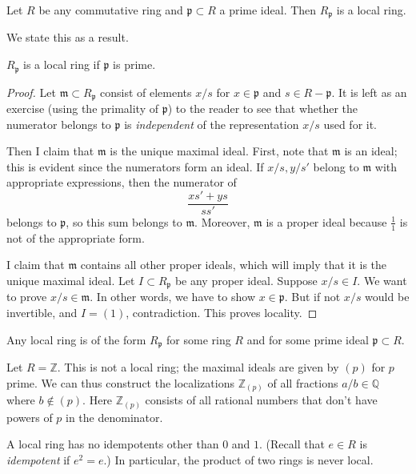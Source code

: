 \begin{example}
Let $R$ be any commutative ring and $\mathfrak{p}\subset R$ a prime ideal. Then
$R_{\mathfrak{p}}$ is a local ring.

We state this as a result.
\begin{proposition}
$R_{\mathfrak{p}}$ is a local ring if $\mathfrak{p}$ is prime.\end{proposition}
\begin{proof}
Let $\mathfrak{m} \subset R_{\mathfrak{p}}$ consist of elements $x/s$ for $x
\in \mathfrak{p}$ and $s \in R - \mathfrak{p}$. It is left as an exercise
(using the primality of $\mathfrak{p}$) to
the reader to see that whether the numerator belongs to $\mathfrak{p}$ is
\emph{independent} of the representation $x/s$ used for it.

Then I claim that $\mathfrak{m}$ is the
unique maximal ideal. First, note that $\mathfrak{m}$ is
an ideal; this is evident since the numerators form an ideal. If $x/s, y/s'$
belong to $\mathfrak{m}$ with appropriate expressions, then
the numerator of
\[ \frac{xs'+ys}{ss'}  \]
belongs to $\mathfrak{p}$, so this sum belongs to $\mathfrak{m}$.  Moreover,
$\mathfrak{m}$ is a proper ideal because $\frac{1}{1}$ is not of the
appropriate form.

I claim that $\mathfrak{m}$ contains all other proper ideals, which will imply
that it is the unique maximal ideal. Let $I \subset R_{\mathfrak{p}}$ be any
proper ideal. Suppose $x/s \in I$.  We want to prove $x/s \in \mathfrak{m}$.
In other words, we have to show $x \in \mathfrak{p}$. But if not $x/s$ would be
invertible, and $I = (1)$, contradiction. This proves locality.
\end{proof}
\end{example}

\begin{exercise}
Any local ring is of the form $R_{\mathfrak{p}}$ for some ring $R$ and for
some prime ideal $\mathfrak{p} \subset R$.
\end{exercise}

\begin{example}
Let $R = \mathbb{Z}$. This is not a local ring; the maximal ideals are given by
$(p)$ for $p$ prime.  We can thus construct the localizations
$\mathbb{Z}_{(p)}$ of all fractions $a/b \in \mathbb{Q}$ where $b \notin (p)$.
Here $\mathbb{Z}_{(p)}$ consists of all rational numbers that don't have
powers of $p$ in the denominator.
\end{example}

\begin{exercise}
A local ring has no idempotents other than $0$ and $1$. (Recall that $e \in R$
is \emph{idempotent} if $e^2 = e$.) In particular, the product of two rings is
never local.
\end{exercise}

